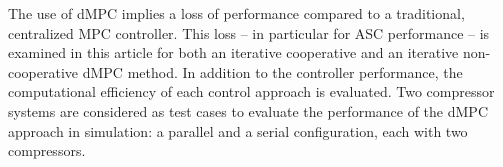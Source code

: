 The use of dMPC implies a loss of performance compared to a traditional, centralized MPC controller.
This loss -- in particular for ASC performance -- is examined in this article for both an iterative cooperative and an iterative non-cooperative dMPC method.
In addition to the controller performance, the computational efficiency of each control approach is evaluated.
Two compressor systems are considered as test cases to evaluate the performance of the dMPC approach in simulation: a parallel and a serial configuration, each with two compressors.
